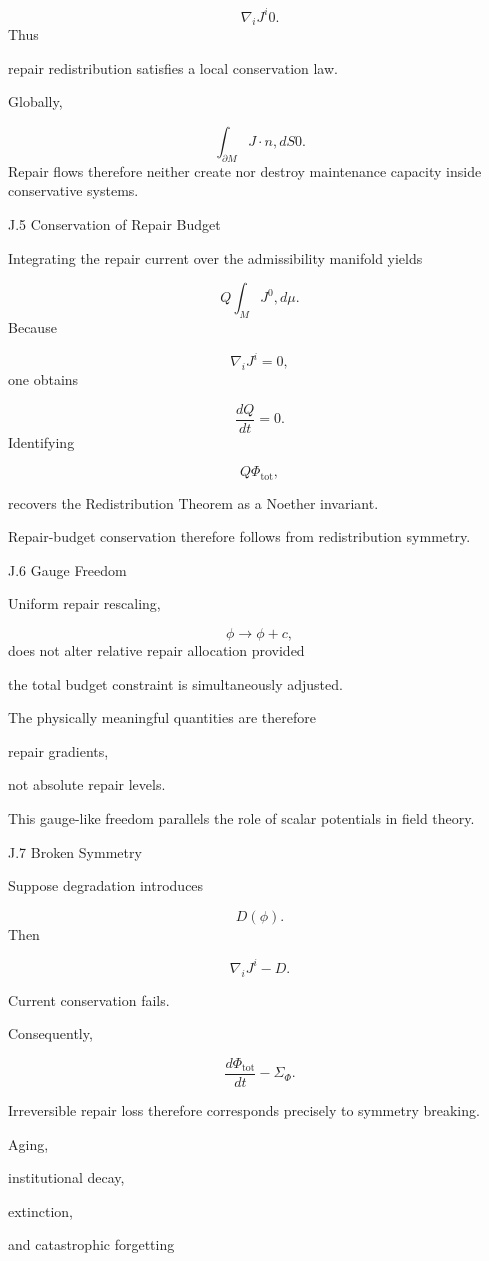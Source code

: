 \documentclass[12pt,oneside]{article}
\theoremstyle{plain}
\theoremstyle{definition}
\theoremstyle{remark}
\begin{document}
\[
\nabla_iJ^i
0. 
\]
Thus

repair redistribution satisfies a local conservation law.

Globally,

\[
\int_{\partial M}
J\cdot n
,dS
0. 
\]
Repair flows therefore neither create nor destroy maintenance capacity inside conservative systems.


J.5 Conservation of Repair Budget

Integrating the repair current over the admissibility manifold yields

\[
Q
\int_M
J^0
,d\mu.
\]
Because

\[
\nabla_iJ^i=0,
\]
one obtains

\[
\boxed{
\frac{dQ}{dt}=0.
}
\]
Identifying

\[
Q
\Phi_{\mathrm{tot}},
\]

recovers the Redistribution Theorem as a Noether invariant.

Repair-budget conservation therefore follows from redistribution symmetry.


J.6 Gauge Freedom

Uniform repair rescaling,

\[
\phi
\rightarrow
\phi+c,
\]
does not alter relative repair allocation provided

the total budget constraint is simultaneously adjusted.

The physically meaningful quantities are therefore

repair gradients,

not absolute repair levels.

This gauge-like freedom parallels the role of scalar potentials in field theory.


J.7 Broken Symmetry

Suppose degradation introduces

\[
D(\phi).
\]
Then

\[
\nabla_iJ^i
-D.
\]

Current conservation fails.

Consequently,

\[
\frac{d\Phi_{\mathrm{tot}}}{dt}
- 

\Sigma_\Phi.
\]

Irreversible repair loss therefore corresponds precisely to symmetry breaking.

Aging,

institutional decay,

extinction,

and catastrophic forgetting
\end{document}
